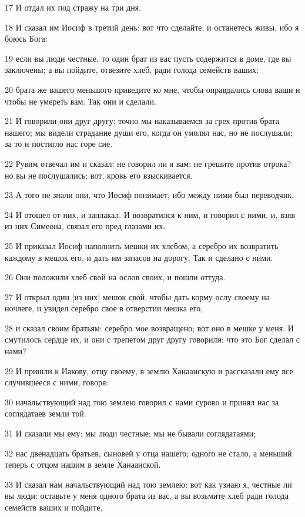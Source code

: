\par 17 И отдал их под стражу на три дня.
\par 18 И сказал им Иосиф в третий день: вот что сделайте, и останетесь живы, ибо я боюсь Бога:
\par 19 если вы люди честные, то один брат из вас пусть содержится в доме, где вы заключены; а вы пойдите, отвезите хлеб, ради голода семейств ваших;
\par 20 брата же вашего меньшого приведите ко мне, чтобы оправдались слова ваши и чтобы не умереть вам. Так они и сделали.
\par 21 И говорили они друг другу: точно мы наказываемся за грех против брата нашего; мы видели страдание души его, когда он умолял нас, но не послушали; за то и постигло нас горе сие.
\par 22 Рувим отвечал им и сказал: не говорил ли я вам: не грешите против отрока? но вы не послушались; вот, кровь его взыскивается.
\par 23 А того не знали они, что Иосиф понимает; ибо между ними был переводчик.
\par 24 И отошел от них, и заплакал. И возвратился к ним, и говорил с ними, и, взяв из них Симеона, связал его пред глазами их.
\par 25 И приказал Иосиф наполнить мешки их хлебом, а серебро их возвратить каждому в мешок его, и дать им запасов на дорогу. Так и сделано с ними.
\par 26 Они положили хлеб свой на ослов своих, и пошли оттуда.
\par 27 И открыл один [из них] мешок свой, чтобы дать корму ослу своему на ночлеге, и увидел серебро свое в отверстии мешка его,
\par 28 и сказал своим братьям: серебро мое возвращено; вот оно в мешке у меня. И смутилось сердце их, и они с трепетом друг другу говорили: что это Бог сделал с нами?
\par 29 И пришли к Иакову, отцу своему, в землю Ханаанскую и рассказали ему все случившееся с ними, говоря:
\par 30 начальствующий над тою землею говорил с нами сурово и принял нас за соглядатаев земли той.
\par 31 И сказали мы ему: мы люди честные; мы не бывали соглядатаями;
\par 32 нас двенадцать братьев, сыновей у отца нашего; одного не стало, а меньший теперь с отцом нашим в земле Ханаанской.
\par 33 И сказал нам начальствующий над тою землею: вот как узнаю я, честные ли вы люди: оставьте у меня одного брата из вас, а вы возьмите хлеб ради голода семейств ваших и пойдите,
